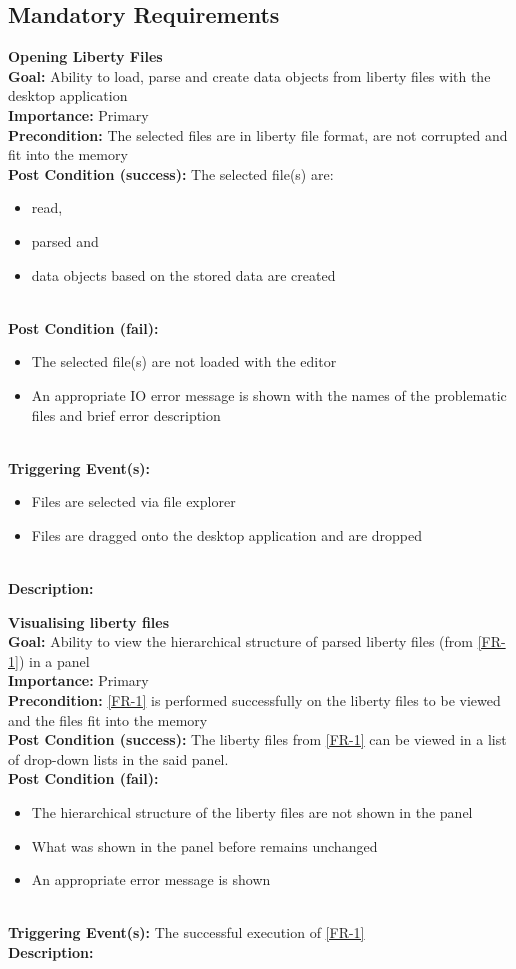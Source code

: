 \documentclass[10pt,a4paper]{report}
\newcommand{\FRDescription}[8]{
    \textbf{#1} \\
    \textbf{Goal: } #2 \\
    \textbf{Importance: } #3 \\
    \textbf{Precondition: } #4 \\
    \textbf{Post Condition (success): } #5 \\
    \textbf{Post Condition (fail): } #6 \\
    \textbf{Triggering Event(s): } #7 \\
    \textbf{Description: } \\ 
    #8}
\begin{document}
\subsection{Mandatory Requirements}
\begin{FR}

    \item \FRDescription{Opening Liberty Files}
    {Ability to load, parse and create data objects from liberty files with the desktop application}
    {Primary}
    {The selected files are in liberty file format, are not corrupted and fit into the memory}
    {The selected file(s) are:
    \begin{itemize}
        \item read,
        \item parsed and
        \item data objects based on the stored data are created
    \end{itemize}}
    {\begin{itemize}
        \item The selected file(s) are not loaded with the editor
        \item An appropriate IO error message is shown with the names of the problematic files and brief error description
    \end{itemize}}
    {\begin{itemize}
        \item Files are selected via file explorer
        \item Files are dragged onto the desktop application and are dropped
    \end{itemize}}
    \item \FRDescription{Visualising liberty files}
    {Ability to view the hierarchical structure of parsed liberty files (from \ref{FR-1}) in a panel}
    {Primary}
    {\ref{FR-1} is performed successfully on the liberty files to be viewed and the files fit into the memory}
    {The liberty files from \ref{FR-1} can be viewed in a list of drop-down lists in the said panel.}
    {\begin{itemize}
        \item The hierarchical structure of the liberty files are not shown in the panel
        \item What was shown in the panel before remains unchanged
        \item An appropriate error message is shown
    \end{itemize}}
    {The successful execution of \ref{FR-1}}
    \item {}

\end{FR}
\end{document}
